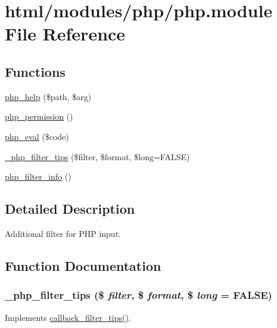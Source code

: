 \hypertarget{php_8module}{
\section{html/modules/php/php.module File Reference}
\label{php_8module}
}
\subsection*{Functions}
\begin{DoxyCompactItemize}
\item 
\hyperlink{php_8module_acec1f98958265ede43be9077b5e7558b}{php\_\-help} (\$path, \$arg)
\item 
\hyperlink{php_8module_a50e182896bf2c44c821b27b3d9332cd5}{php\_\-permission} ()
\item 
\hyperlink{group__php__wrappers_ga116b8b70b569d3b04f7e0717c8984ed6}{php\_\-eval} (\$code)
\item 
\hyperlink{php_8module_a8fdbeaead6c27af21a6ac6bf6fc20dd4}{\_\-php\_\-filter\_\-tips} (\$filter, \$format, \$long=FALSE)
\item 
\hyperlink{php_8module_a623699ac83c3473534eb2b8a96f052d2}{php\_\-filter\_\-info} ()
\end{DoxyCompactItemize}


\subsection{Detailed Description}
Additional filter for PHP input. 

\subsection{Function Documentation}
\hypertarget{php_8module_a8fdbeaead6c27af21a6ac6bf6fc20dd4}{
\subsubsection[{\_\-php\_\-filter\_\-tips}]{\setlength{\rightskip}{0pt plus 5cm}\_\-php\_\-filter\_\-tips (\$ {\em filter}, \/  \$ {\em format}, \/  \$ {\em long} = {\ttfamily FALSE})}}
\label{php_8module_a8fdbeaead6c27af21a6ac6bf6fc20dd4}
Implements \hyperlink{group__callbacks_gabe5ee7c795e0adac0bccb8061006949e}{callback\_\-filter\_\-tips()}.

